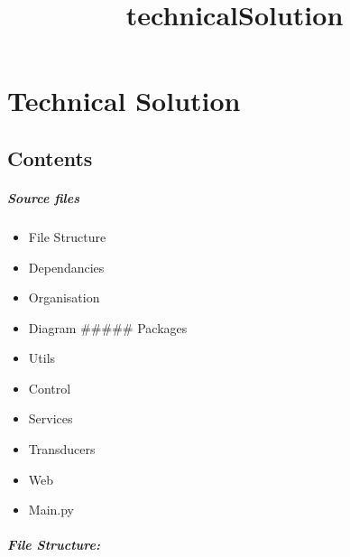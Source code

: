 \documentclass[11pt]{article}
\title{technicalSolution}
\providecommand{\tightlist}{%
      \setlength{\itemsep}{0pt}\setlength{\parskip}{0pt}}
\begin{document}
    
    \maketitle
    
    

    
    \section{Technical Solution}\label{technical-solution}

    \subsection{Contents}\label{contents}

\subparagraph{Source files}\label{source-files}

\begin{itemize}
\tightlist
\item
  File Structure
\item
  Dependancies
\item
  Organisation
\item
  Diagram \#\#\#\#\# Packages
\item
  Utils
\item
  Control
\item
  Services
\item
  Transducers
\item
  Web
\item
  Main.py
\end{itemize}

    \subparagraph{File Structure:}\label{file-structure}
\end{document}
